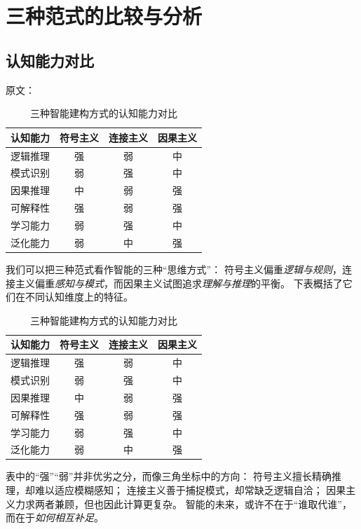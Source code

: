 \section{三种范式的比较与分析}

\subsection{认知能力对比}

原文：
\begin{table}[h]
\centering
\caption{三种智能建构方式的认知能力对比}
\begin{tabular}{|l|c|c|c|}
\hline
\textbf{认知能力} & \textbf{符号主义} & \textbf{连接主义} & \textbf{因果主义} \\
\hline
逻辑推理 & 强 & 弱 & 中 \\
模式识别 & 弱 & 强 & 中 \\
因果推理 & 中 & 弱 & 强 \\
可解释性 & 强 & 弱 & 强 \\
学习能力 & 弱 & 强 & 中 \\
泛化能力 & 弱 & 中 & 强 \\
\hline
\end{tabular}
\end{table}
我们可以把三种范式看作智能的三种“思维方式”：  
符号主义偏重\emph{逻辑与规则}，连接主义偏重\emph{感知与模式}，而因果主义试图追求\emph{理解与推理}的平衡。  
下表概括了它们在不同认知维度上的特征。  

\begin{table}[h]
\centering
\caption{三种智能建构方式的认知能力对比}
\begin{tabular}{|l|c|c|c|}
\hline
\textbf{认知能力} & \textbf{符号主义} & \textbf{连接主义} & \textbf{因果主义} \\
\hline
逻辑推理 & 强 & 弱 & 中 \\
模式识别 & 弱 & 强 & 中 \\
因果推理 & 中 & 弱 & 强 \\
可解释性 & 强 & 弱 & 强 \\
学习能力 & 弱 & 强 & 中 \\
泛化能力 & 弱 & 中 & 强 \\
\hline
\end{tabular}
\end{table}

表中的“强”“弱”并非优劣之分，而像三角坐标中的方向：  
符号主义擅长精确推理，却难以适应模糊感知；  
连接主义善于捕捉模式，却常缺乏逻辑自洽；  
因果主义力求两者兼顾，但也因此计算更复杂。  
智能的未来，或许不在于“谁取代谁”，而在于\emph{如何相互补足}。

